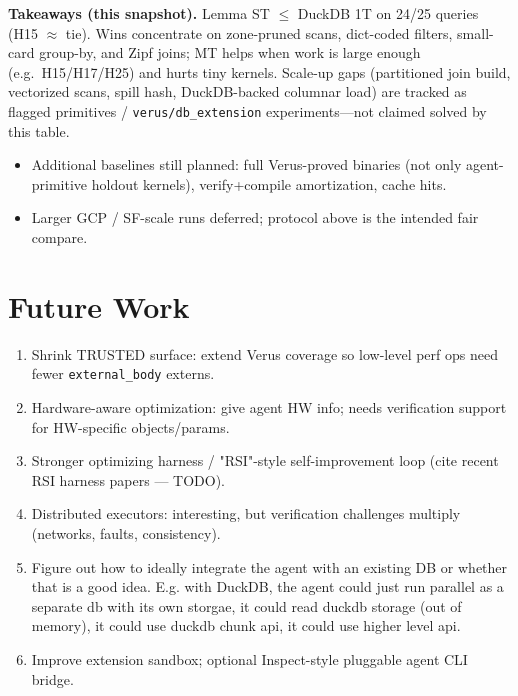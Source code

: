 \documentclass[sigconf, nonacm]{acmart}
\begin{document}
\noindent\textbf{Takeaways (this snapshot).}
Lemma ST $\le$ DuckDB 1T on 24/25 queries (H15 $\approx$ tie). Wins concentrate on
zone-pruned scans, dict-coded filters, small-card group-by, and Zipf joins; MT
helps when work is large enough (e.g.\ H15/H17/H25) and hurts tiny kernels.
Scale-up gaps (partitioned join build, vectorized scans, spill hash, DuckDB-backed
columnar load) are tracked as flagged primitives / \texttt{verus/db\_extension}
experiments---not claimed solved by this table.

\begin{itemize}
  \item Additional baselines still planned: full Verus-proved binaries (not only
        agent-primitive holdout kernels), verify+compile amortization, cache hits.
  \item Larger GCP / SF-scale runs deferred; protocol above is the intended fair compare.
\end{itemize}

\section{Future Work}

\begin{enumerate}
  \item Shrink TRUSTED surface: extend Verus coverage so low-level perf ops need fewer \texttt{external\_body} externs.
  \item Hardware-aware optimization: give agent HW info; needs verification support for HW-specific objects/params.
  \item Stronger optimizing harness / "RSI"-style self-improvement loop (cite recent RSI harness papers --- TODO).
  \item Distributed executors: interesting, but verification challenges multiply (networks, faults, consistency).
  \item Figure out how to ideally integrate the agent with an existing DB or whether that is a good idea. E.g. with DuckDB, the agent could just run parallel as a separate db with its own storgae, it could read duckdb storage (out of memory), it could use duckdb chunk api, it could use higher level api.
  \item Improve extension sandbox; optional Inspect-style pluggable agent CLI bridge.
\end{enumerate}
\end{document}
